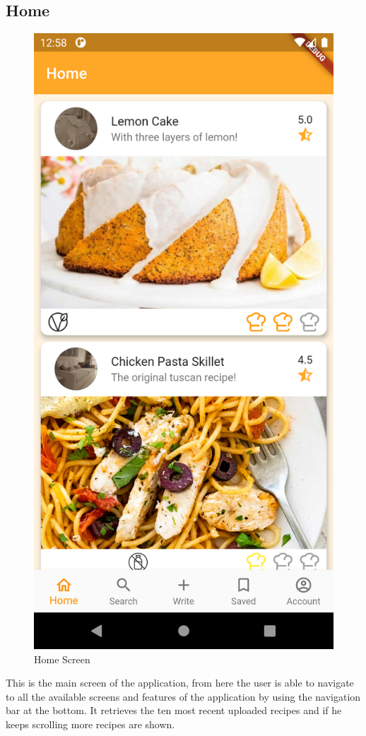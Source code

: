 \subsection{Home}
\begin{figure}[H]
	\centering
	\includegraphics[width = .225\linewidth]{img/Home.png}
	\caption{Home Screen}
\end{figure}
This is the main screen of the application, from here the user is able to navigate to all the available screens and features of the application by using the navigation bar at the bottom.
It retrieves the ten most recent uploaded recipes and if he keeps scrolling more recipes are shown.

